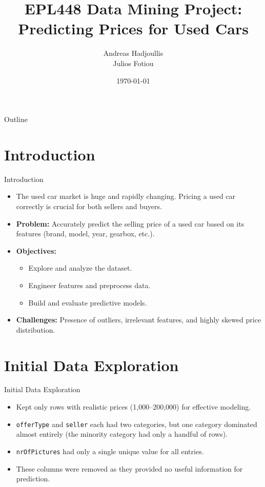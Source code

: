 \documentclass{beamer}
\title{EPL448 Data Mining Project: Predicting Prices for Used Cars}
\author{Andreas Hadjoullis\\Julios Fotiou}
\institute{Department of Computer Science \\ University of Cyprus}
\date{\today}
\begin{document}
\begin{frame}
    \titlepage
\end{frame}

\begin{frame}{Outline}
    \tableofcontents
\end{frame}

\section{Introduction}
\begin{frame}{Introduction}
    \begin{itemize}
        \item The used car market is huge and rapidly changing. Pricing a used car correctly is crucial for both sellers and buyers.
        \item \textbf{Problem:} Accurately predict the selling price of a used car based on its features (brand, model, year, gearbox, etc.).
        \item \textbf{Objectives:}
            \begin{itemize}
                \item Explore and analyze the dataset.
                \item Engineer features and preprocess data.
                \item Build and evaluate predictive models.
            \end{itemize}
        \item \textbf{Challenges:} Presence of outliers, irrelevant features, and highly skewed price distribution.
    \end{itemize}
\end{frame}

\section{Initial Data Exploration}
\begin{frame}{Initial Data Exploration}
    \begin{itemize}
        \item Kept only rows with realistic prices (1,000–200,000) for effective modeling.
        \item \texttt{offerType} and \texttt{seller} each had two categories, but one category dominated almost entirely (the minority category had only a handful of rows).
        \item \texttt{nrOfPictures} had only a single unique value for all entries.
        \item These columns were removed as they provided no useful information for prediction.
    \end{itemize}
\end{frame}
\end{document}
